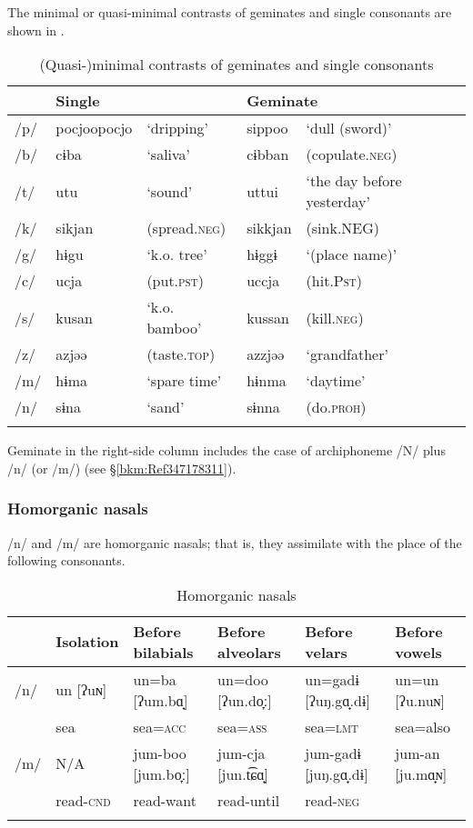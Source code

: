 The minimal or quasi-minimal contrasts of geminates and single consonants are shown in .

\begin{table}
\caption{(Quasi-)minimal contrasts of geminates and single consonants\label{tab:2:9}}
\begin{tabular}{ *{5}{l} } 
\lsptoprule
& \multicolumn{2}{l}{Single} &  \multicolumn{2}{l}{Geminate} \\\midrule
/p/ & pocjoopocjo & ‘dripping’ & sippoo & ‘dull (sword)’\\
/b/ & cɨba  & ‘saliva’ & cɨbban & (copulate.\textsc{neg})\\
/t/ & utu   & ‘sound’ & uttui & ‘the day before yesterday’\\
/k/ & sikjan & (spread.\textsc{neg}) &  sikkjan & (sink.NEG)\\
/g/ & hɨgu & ‘k.o. tree’ &  hɨggɨ &  ‘(place name)’\\
/c/ & ucja  & (put.\textsc{pst})  & uccja  & (hit.P\textsc{st})\\
/s/ & kusan & ‘k.o. bamboo’ & kussan & (kill.\textsc{neg})\\
/z/ & azjəə & (taste.\textsc{top}) &  azzjəə & ‘grandfather’\\
/m/ & hɨma & ‘spare time’ & hɨnma & ‘daytime’\\
/n/ & sɨna   & ‘sand’ &  sɨnna &  (do.\textsc{proh})\\
\lspbottomrule
\end{tabular}
\end{table}

Geminate in the right-side column includes the case of archiphoneme /N/ plus /n/ (or /m/) (see §\ref{bkm:Ref347178311}).

\subsubsection{Homorganic nasals}

/n/ and /m/ are homorganic nasals; that is, they assimilate with the place of the following consonants.

\begin{table}\footnotesize
\caption{Homorganic nasals}
\begin{tabular}{ *{6}{l} } 
\lsptoprule
  & Isolation  &  Before bilabials &  Before alveolars&   Before velars &  Before vowels\\\midrule
 /n/  & un [ʔuɴ]  & un=ba [ʔum.bɑ̟] &  un=doo [ʔun.do̞ː]  & un=gadɨ [ʔuŋ.gɑ̟.dɨ]  & un=un [ʔu.nuɴ]\\
      &sea        & sea=\textsc{acc}        &   sea=\textsc{ass}          &  sea=\textsc{lmt}             & sea=also\\
 /m/  & N/A      & jum-boo [jum.bo̞ː]  & jum-cja [jun.t͡ɕɑ̟] &  jum-gadɨ [juŋ.gɑ̟.dɨ] &  jum-an [ju.mɑ̟ɴ]\\
      & read-\textsc{cnd} &  read-want  & read-until &  read-\textsc{neg}\\
\lspbottomrule
\end{tabular}
\end{table}

